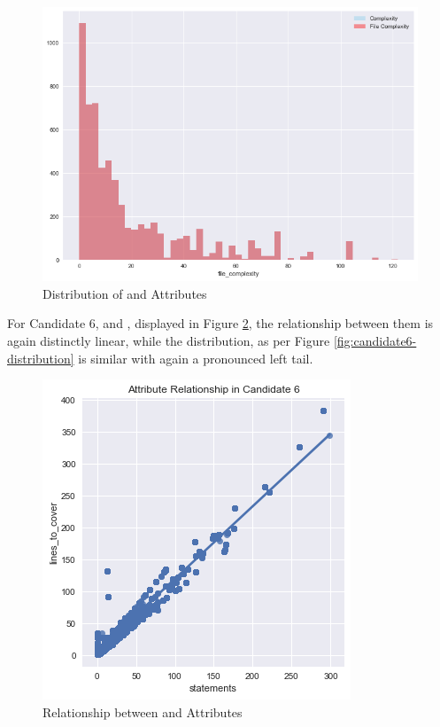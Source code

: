 \begin{figure}[!h]
    \centering
    \includegraphics[scale=0.6]{Figures/correlation/Attribute_Distribution_in_Candidate_5.png}
    \caption{Distribution of \complexity{} and \fileComplexity{} Attributes}
    \label{fig:candidate5-distribution}
\end{figure}

For Candidate 6, \statements{} and \linesToCover{}, displayed in Figure \ref{fig:candidate6-scatterplot}, the relationship between them is again distinctly linear, while the distribution, as per Figure \ref{fig:candidate6-distribution} is similar with again a pronounced left tail. 

\begin{figure}[!h]
    \centering
    \includegraphics[scale=0.7]{Figures/correlation/Attribute_Relationship_in_Candidate_6.png}
    \caption{Relationship between \statements{} and \linesToCover{} Attributes}
    \label{fig:candidate6-scatterplot}
\end{figure}


